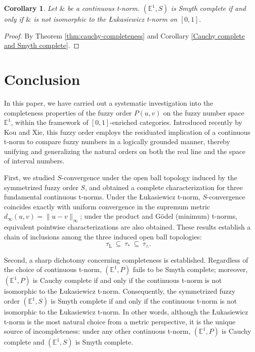 \documentclass[preprint,3p,times]{elsarticle}
\theoremstyle{plain}
\newtheorem{cor}[thm]{Corollary}
\theoremstyle{definition}
\newcommand{\Luk}{\mathrm{L}}
\numberwithin{equation}{section}
\begin{document}
\begin{cor}
       Let $\&$ be a continuous t-norm. \((\mathbb{E}^1,S) \) is Smyth complete if and only if $\&$ is not isomorphic to the {\L}ukasiewicz t-norm on \([0,1]\).

\end{cor}
\begin{proof}
By Theorem \ref{thm:cauchy-completeness} and Corollary \ref{Cauchy complete and Smyth complete}.    
\end{proof}

\section{Conclusion}
In this paper, we have carried out a systematic investigation into the completeness properties of the fuzzy order \(P(u,v)\) on the fuzzy number space \(\mathbb{E}^1\), within the framework of \([0,1]\)-enriched categories. Introduced recently by Kou and Xie, this fuzzy order employs the residuated implication of a continuous t-norm to compare fuzzy numbers in a logically grounded manner, thereby unifying and generalizing the natural orders on both the real line and the space of interval numbers.


First, we studied \(S\)-convergence under the open ball topology induced by the symmetrized fuzzy order \(S\), and obtained a complete characterization for three fundamental continuous t-norms. Under the {\L}ukasiewicz t-norm, \(S\)-convergence coincides exactly with uniform convergence in the supremum metric \(d_\infty(u,v)=\|u-v\|_\infty\); under the product and G\"odel (minimum) t-norms, equivalent pointwise characterizations are also obtained. These results establish a chain of inclusions among the three induced open ball topologies:
\[
\tau_{\Luk}\ \subseteq\ \tau_{*}\ \subseteq\ \tau_{\wedge}.
\]

Second, a sharp dichotomy concerning completeness is established. Regardless of the choice of continuous t-norm, \((\mathbb{E}^1,P)\) fails to be Smyth complete; moreover, \((\mathbb{E}^1,P)\) is Cauchy complete if and only if the continuous t-norm is not isomorphic to the {\L}ukasiewicz t-norm. Consequently, the symmetrized fuzzy order \((\mathbb{E}^1,S)\) is Smyth complete if and only if the continuous t-norm is not isomorphic to the {\L}ukasiewicz t-norm. In other words, although the {\L}ukasiewicz t-norm is the most natural choice from a metric perspective, it is the unique source of incompleteness: under any other continuous t-norm, \((\mathbb{E}^1,P)\) is Cauchy complete and \((\mathbb{E}^1,S)\) is Smyth complete.
\end{document}
